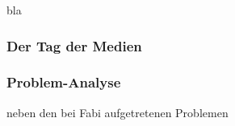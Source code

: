 \label{ssec:Praxis}

bla

\subsubsection{Der Tag der Medien}
\subsubsection{Problem-Analyse}
neben den bei Fabi aufgetretenen Problemen